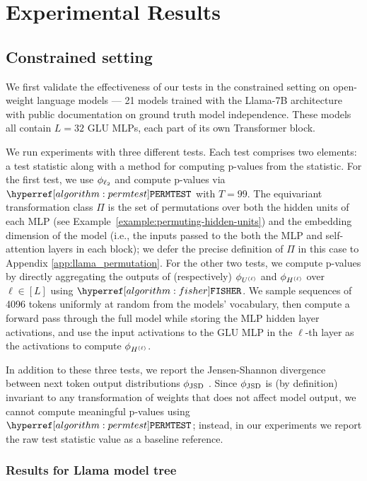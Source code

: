 \section{Experimental Results}

\subsection{Constrained setting}
\label{sec:constrained-results}

We first validate the effectiveness of our tests in the constrained setting on open-weight language models --- 21 models trained with the Llama-7B architecture with public documentation on ground truth model independence. These models all contain $L = 32$ GLU MLPs, each part of its own Transformer block.

We run experiments with three different tests. Each test comprises two elements: a test statistic along with a method for computing p-values from the statistic.
For the first test, we use $\phi_{\ell_2}$ and compute p-values via $\permtest$ with $T = 99$.
The equivariant transformation class $\Pi$ is the set of permutations over both the hidden units of each MLP (see Example~\ref{example:permuting-hidden-units}) and the embedding dimension of the model (i.e., the inputs passed to the both the MLP and self-attention layers in each block); we defer the precise definition of $\Pi$ in this case to Appendix \ref{app:llama_permutation}.
For the other two tests, we compute p-values by directly aggregating the outputs of (respectively) $\phi_{U^{(\ell)}}$ and $\phi_{H^{(\ell)}}$ over $\ell \in [L]$ using $\fisher$.
We sample sequences of 4096 tokens uniformly at random from the models' vocabulary, then compute a forward pass through the full model while storing the MLP hidden layer activations, and use the input activations to the GLU MLP in the $\ell$-th layer as the activations to compute $\phi_{H^{(\ell)}}$.

In addition to these three tests, we report the Jensen-Shannon divergence between next token output distributions $\phi_{\textup{JSD}}$ \citep{jsd}.
Since $\phi_{\textup{JSD}}$ is (by definition) invariant to any transformation of weights that does not affect model output, we cannot compute meaningful p-values using $\permtest$; instead, in our experiments we report the raw test statistic value as a baseline reference.

\subsubsection{Results for Llama model tree}

